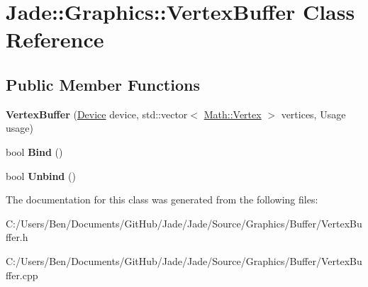 \hypertarget{class_jade_1_1_graphics_1_1_vertex_buffer}{}\section{Jade\+:\+:Graphics\+:\+:Vertex\+Buffer Class Reference}
\label{class_jade_1_1_graphics_1_1_vertex_buffer}
\subsection*{Public Member Functions}
\begin{DoxyCompactItemize}
\item 
\hypertarget{class_jade_1_1_graphics_1_1_vertex_buffer_a435ae7b6fb2d9dcb65a1fe0e3db45d2e}{}{\bfseries Vertex\+Buffer} (\hyperlink{class_jade_1_1_graphics_1_1_device}{Device} device, std\+::vector$<$ \hyperlink{struct_jade_1_1_math_1_1_vertex}{Math\+::\+Vertex} $>$ vertices, Usage usage)\label{class_jade_1_1_graphics_1_1_vertex_buffer_a435ae7b6fb2d9dcb65a1fe0e3db45d2e}

\item 
\hypertarget{class_jade_1_1_graphics_1_1_vertex_buffer_af233c132d986c09b6d601257501a1670}{}bool {\bfseries Bind} ()\label{class_jade_1_1_graphics_1_1_vertex_buffer_af233c132d986c09b6d601257501a1670}

\item 
\hypertarget{class_jade_1_1_graphics_1_1_vertex_buffer_ad87300b7f26883d662693431971c16ec}{}bool {\bfseries Unbind} ()\label{class_jade_1_1_graphics_1_1_vertex_buffer_ad87300b7f26883d662693431971c16ec}

\end{DoxyCompactItemize}


The documentation for this class was generated from the following files\+:\begin{DoxyCompactItemize}
\item 
C\+:/\+Users/\+Ben/\+Documents/\+Git\+Hub/\+Jade/\+Jade/\+Source/\+Graphics/\+Buffer/Vertex\+Buffer.\+h\item 
C\+:/\+Users/\+Ben/\+Documents/\+Git\+Hub/\+Jade/\+Jade/\+Source/\+Graphics/\+Buffer/Vertex\+Buffer.\+cpp\end{DoxyCompactItemize}
